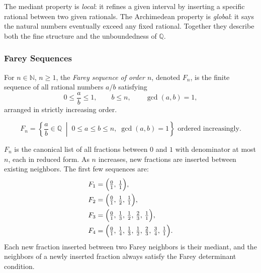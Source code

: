 \begin{remark}
\label{rem:mediant-vs-arch}
The mediant property is \emph{local}: it refines a given interval by
inserting a specific rational between two given rationals.
The Archimedean property is \emph{global}: it says the natural numbers
eventually exceed any fixed rational.
Together they describe both the fine structure and the unboundedness of
$\mathbb{Q}$.
\end{remark}

\subsubsection{Farey Sequences}

\begin{tcolorbox}[colback=defbox, colframe=defborder, arc=2pt,
  left=6pt, right=6pt, top=4pt, bottom=4pt,
  title={\small\textbf{Definition (Farey Sequence)}},
  fonttitle=\small\bfseries]
\begin{definition}
\label{def:farey-sequence}
For $n \in \mathbb{N}$, $n \geq 1$, the \emph{Farey sequence of order $n$},
denoted $F_n$, is the finite sequence of all rational numbers $a/b$ satisfying
\[
0 \leq \frac{a}{b} \leq 1, \qquad b \leq n, \qquad \gcd(a,b) = 1,
\]
arranged in strictly increasing order.
\end{definition}
\end{tcolorbox}

\begin{remark*}
\[
F_n = \left\{ \frac{a}{b} \in \mathbb{Q} \;\middle|\;
0 \leq a \leq b \leq n,\; \gcd(a,b)=1 \right\}
\text{ ordered increasingly.}
\]
\end{remark*}

\begin{remark*}[Interpretation]
$F_n$ is the canonical list of all fractions between $0$ and $1$ with
denominator at most $n$, each in reduced form.  As $n$ increases, new
fractions are inserted between existing neighbors.  The first few sequences are:
\begin{align*}
F_1 &= \Bigl(\tfrac{0}{1},\, \tfrac{1}{1}\Bigr), \\
F_2 &= \Bigl(\tfrac{0}{1},\, \tfrac{1}{2},\, \tfrac{1}{1}\Bigr), \\
F_3 &= \Bigl(\tfrac{0}{1},\, \tfrac{1}{3},\, \tfrac{1}{2},\,
              \tfrac{2}{3},\, \tfrac{1}{1}\Bigr), \\
F_4 &= \Bigl(\tfrac{0}{1},\, \tfrac{1}{4},\, \tfrac{1}{3},\,
              \tfrac{1}{2},\, \tfrac{2}{3},\, \tfrac{3}{4},\,
              \tfrac{1}{1}\Bigr).
\end{align*}
Each new fraction inserted between two Farey neighbors is their mediant,
and the neighbors of a newly inserted fraction always satisfy the Farey
determinant condition.
\end{remark*}

